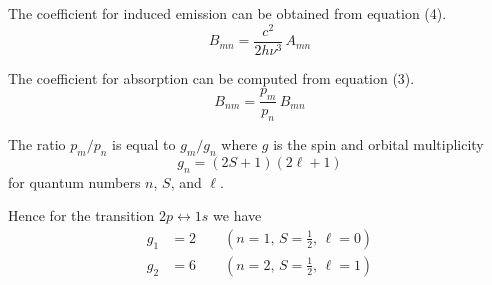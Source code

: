 \documentclass[12pt]{article}
\newcommand\BNM{B_{nm}} %
\newcommand\BMN{B_{mn}} %
\newcommand\AMN{A_{mn}} %
\begin{document}
\noindent
The coefficient for induced emission can be obtained from equation (4).
\begin{equation*}
\BMN=\frac{c^2}{2h\nu^3}\,\AMN
\end{equation*}

\noindent
The coefficient for absorption can be computed from equation (3).
\begin{equation*}
\BNM=\frac{p_m}{p_n}\,\BMN
\end{equation*}

\noindent
The ratio $p_m/p_n$ is equal to $g_m/g_n$ where $g$ is the spin and orbital multiplicity
\begin{equation*}
g_n=(2S+1)(2\ell+1)
\end{equation*}
for quantum numbers $n$, $S$, and $\ell$.

\bigskip
\noindent
Hence for the transition $2p\leftrightarrow1s$ we have
\begin{align*}
g_1&=2\qquad(n=1,\,S=\tfrac{1}{2},\,\ell=0)
\\
g_2&=6\qquad(n=2,\,S=\tfrac{1}{2},\,\ell=1)
\end{align*}
\end{document}

